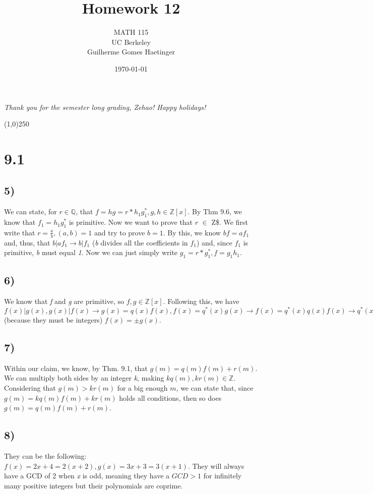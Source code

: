 \documentclass[11pt]{article}
\author{MATH 115 \\ UC Berkeley \\ Guilherme Gomes Haetinger}
\date{\today}
\title{\huge Homework 12}
\begin{document}
\maketitle
\begin{center}
\emph{Thank you for the semester long grading, Zehao! Happy holidays!}
\end{center}

\begin{center}
\line(1,0){250}
\end{center}

\section*{9.1}
\label{sec:org38b6fcc}
\subsection*{5)}
\label{sec:org4f3ca33}
We can state, for \(r \in \mathbb{Q}\), that \(f = hg = r*h_1g^*_1, g,h \in \mathbb{Z}[x]\). By Thm 9.6, we know that \(f_1 = h_1g^*_1\) is primitive. Now  we want to prove that \(r\) \(\in\) Z\$. We first write that \(r = \frac{a}{b}, (a, b) = 1\) and try to prove \(b=1\). By this, we know \(bf = af_1\) and, thus, that \(b|af_1 \to b|f_1\) (\emph{b} divides all the coefficients in \(f_1\)) and, since \(f_1\) is primitive, \emph{b} must equal \emph{1}. Now we can just simply write \(g_1 = r * g^*_1, f = g_1h_1\).
\subsection*{6)}
\label{sec:org69551fa}
We know that \emph{f} and \emph{g} are primitive, so \(f,g \in  \mathbb{Z}[x]\). Following this, we have \(f(x)|g(x), g(x)|f(x) \to g(x) = q(x)f(x), f(x) = q^*(x)g(x) \to f(x) = q^*(x)q(x)f(x) \to q^*(x)q(x) = \pm 1\) (because they must be integers) \(f(x) = \pm g(x)\).
\subsection*{7)}
\label{sec:org84e224d}
Within our claim, we know, by Thm. 9.1, that \(g(m) = q(m)f(m) + r(m)\). We can multiply both sides by an integer \emph{k}, making \(kq(m), kr(m) \in \mathbb{Z}\). Considering that \(g(m) > kr(m)\) for a big enough \(m\), we can state that, since \(g(m) = kq(m)f(m) + kr(m)\) holds all conditions, then so does \(g(m) = q(m)f(m) + r(m)\).
\subsection*{8)}
\label{sec:orgf20d320}
They can be the following: \(f(x) = 2x + 4 = 2(x+2), g(x) = 3x + 3 = 3(x + 1)\). They will always have a GCD of 2 when \emph{x} is odd, meaning they have a \(GCD > 1\) for infinitely many positive integers but their polynomials are coprime.
\end{document}

